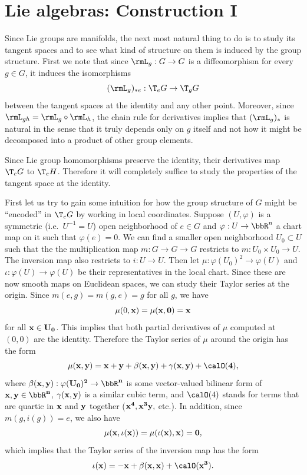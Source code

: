 \section{Lie algebras: Construction I}

Since Lie groups are manifolds, the next most natural thing to do is to study its tangent spaces and to see what kind of structure on them is induced by the group structure. 
First we note that since $\rmL_g:G\to G$ is a diffeomorphism for every $g\in G$, it induces the isomorphisms
\[(\rmL_g)_{\ast e}: \T_e G\to \T_g G\]
between the tangent spaces at the identity and any other point. Moreover, since $\rmL_{gh}=\rmL_g\circ \rmL_h$, the chain rule for derivatives implies that $(\rmL_g)_\ast$ is natural in the sense that it truly depends only on $g$ itself and not how it might be decomposed into a product of other group elements.

Since Lie group homomorphisms preserve the identity, their derivatives map $\T_e G$ to $\T_eH$. Therefore it will completely suffice to study the properties of the tangent space at the identity.


First let us try to gain some intuition for how the group structure of $G$ might be ``encoded'' in $\T_e G$ by working in local coordinates. Suppose $(U,\varphi)$ is a symmetric (i.e.~$U^{-1}=U$) open neighborhood of $e\in G$ and $\varphi:U\to \bbR^n$ a chart map on it such that $\varphi(e)=0$. We can find a smaller open neighborhood $U_0\subset U$ such that the the multiplication map $m:G\to G\to G$ restricts to $m:U_0\times U_0\to U$. The inversion map also restricts to $i:U\to U$. Then let $\mu:\varphi (U_0)^2\to \varphi(U)$ and $\iota:\varphi(U)\to \varphi(U)$ be their representatives in the local chart. Since these are now smooth maps on Euclidean spaces, we can study their Taylor series at the origin. Since $m(e,g)=m(g,e)=g$ for all $g$, we have
\[\mu(0,\bf{x})=\mu(\bf{x},0)=\bf{x}\]
for all $\bf{x}\in U_0$. This implies that both partial derivatives of $\mu$ computed at $(0,0)$ are the identity. Therefore the Taylor series of $\mu$ around the origin has the form
\[\mu(\bf{x},\bf{y})=\bf{x}+\bf{y}+\beta(\bf{x},\bf{y})+\gamma(\bf{x},\bf{y})+\calO(4),\]
where $\beta(\bf{x},\bf{y}):\varphi(U_0)^2\to \bbR^n$ is some vector-valued bilinear form of $\bf{x},\bf{y}\in\bbR^n$, $\gamma(\bf{x},\bf{y})$ is a similar cubic term, and $\calO(4)$ stands for terms that are quartic in $\bf{x}$ and $\bf{y}$ together ($\bf{x}^4, \bf{x}^3 \bf{y},$ etc.). In addition, since $m(g,i(g))=e$, we also have
\[\mu(\bf{x},\iota(\bf{x}))=\mu(\iota(\bf{x}),\bf{x})=0,\]
which implies that the Taylor series of the inversion map has the form
\[\iota(\bf{x})=-\bf{x}+\beta(\bf{x},\bf{x})+\calO(\bf{x}^3).\]

